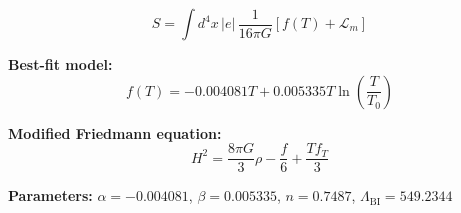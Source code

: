 
\begin{equation}
  S = \int d^4x \, |e| \, \frac{1}{16\pi G} \left[ f(T) + \mathcal{L}_m \right]
\end{equation}

\textbf{Best-fit model:}
\begin{equation}
  f(T) = -0.004081 T + 0.005335 T \ln\!\left(\frac{T}{T_0}\right)
\end{equation}

\textbf{Modified Friedmann equation:}
\begin{equation}
  H^2 = \frac{8\pi G}{3} \rho - \frac{f}{6} + \frac{T f_T}{3}
\end{equation}

\textbf{Parameters:}
$\alpha = -0.004081$, \quad
$\beta = 0.005335$, \quad
$n = 0.7487$, \quad
$\Lambda_{\text{BI}} = 549.2344$